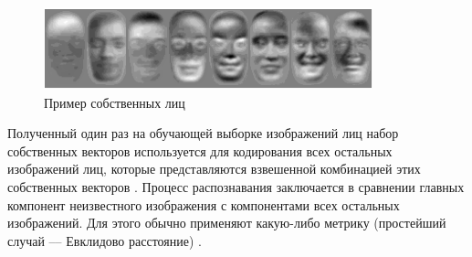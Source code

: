 \begin{figure}[H]
	\centering
	\includegraphics[width=0.85\textwidth]{img/pca2.png} 
	\caption{Пример собственных лиц \cite{brilyuk}}
	\label{fig:principal_components}
\end{figure}

Полученный один раз на обучающей выборке изображений лиц набор собственных векторов используется для кодирования всех остальных изображений лиц, которые представляются взвешенной комбинацией этих собственных векторов \cite{parshin}. Процесс распознавания заключается в сравнении главных компонент неизвестного изображения с компонентами всех остальных изображений. Для этого обычно применяют какую-либо метрику (простейший случай –-- Евклидово расстояние) \cite{brilyuk}. 
	